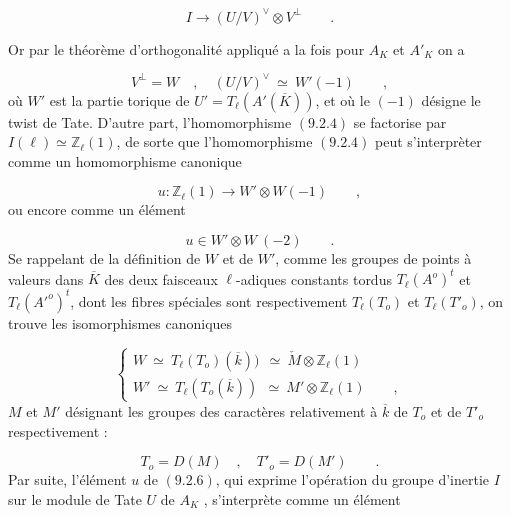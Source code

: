 \begin{equation}\tag{9.2.4}
I \longrightarrow (U/V)^{\vee} \otimes V^{\perp} \qquad .
\end{equation}


Or par le théorème d'orthogonalité appliqué a la fois pour $A_K$ et $A'_K$ on a

\begin{equation*}
V^{\perp} = W \quad ,\quad (U/V)^{\vee} \ \simeq\ W'(-1) \qquad ,
\end{equation*}
où $W'$ est la partie torique de $U'=T_{\ell}(A'(\overline{K}))$, et où le $(-1)$ désigne le twist de Tate. D'autre part, l'homomorphisme $(9.2.4)$ se factorise par $I(\ell) \simeq \mathbb{Z}_{\ell}(1)$, de sorte que l'homomorphisme $(9.2.4)$ peut s'interprèter comme un homomorphisme canonique

\begin{equation}\tag{9.2.5}
u: \mathbb{Z}_{\ell}(1) \longrightarrow W'\otimes W(-1) \qquad ,
\end{equation}
ou encore comme un élément

\begin{equation}\tag{9.2.6}
u \in W' \otimes W\ (-2) \qquad .
\end{equation}
Se rappelant de la définition de $W$ et de $W'$, comme les groupes de points à valeurs dans $\overline{K}$ des deux faisceaux $\ell$-adiques constants tordus $T_{\ell}(A^o)^t$ et $T_{\ell}({A'}^{o})^t$, dont les fibres spéciales sont respectivement $T_{\ell}(T_o)$ et $T_{\ell}(T'_o)$, on trouve les isomorphismes canoniques

\begin{equation}\tag{9.2.7}
\left\{ \begin{array}{l} W \ \simeq\ T_{\ell}(T_o)(\overline{k})) \ \ \simeq\ \check{M} \otimes \mathbb{Z}_{\ell}(1) \\[3ex] W' \ \simeq\ T_{\ell}(T_o(\overline{k})) \ \ \simeq\ M' \otimes \mathbb{Z}_{\ell}(1) \qquad , \end{array} \right.
\end{equation}
$M$ et $M'$ désignant les groupes des caractères relativement à $\overline{k}$ de $T_o$ et de $T'_o$ respectivement :

\begin{equation}\tag{9.2.8}
T_o = D(M) \quad ,\quad T'_o = D(M') \qquad .
\end{equation}
Par suite, l'élément $u$ de $(9.2.6)$, qui  exprime l'opération du groupe d'inertie $I$ sur le module de Tate $U$ de $A_K$ , s'interprète comme un élément


